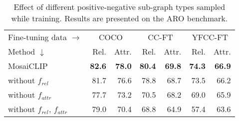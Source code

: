 \documentclass[11pt]{article}
\newcommand{\methodcomp}{MosaiCLIP}
\begin{document}
\begin{table}[h!]
\scriptsize
  \fontsize{8.5}{10pt}\selectfont
      \centering
      \setlength{\tabcolsep}{4.2pt}
      {
    \begin{tabular}{lrr|rr|rr}
      \toprule
      Fine-tuning data $\rightarrow$ & \multicolumn{2}{c}{COCO} & \multicolumn{2}{c}{CC-FT} & \multicolumn{2}{c}{YFCC-FT} \\
      Method $\downarrow$ & Rel. & Attr. & Rel. & Attr. & Rel. & Attr. \\
      \midrule 
      \methodcomp & \textbf{82.6} & \textbf{78.0} & \textbf{80.4} & \textbf{69.8} & \textbf{74.3} & \textbf{66.9} \\[1pt]
      \midrule 
      without $f_{rel}$ & 81.7 & 76.6 & 78.8 & 68.7 & 73.5 & 66.2\\[1pt]
      without $f_{attr}$ & 77.7 & 73.2 & 70.5 & 68.2 & 69.0 & 65.9\\[1pt]
      without $f_{rel}$, $f_{attr}$ & 79.0 & 70.4 & 68.8 & 64.9 & 57.4 & 63.6\\[1pt]
      \bottomrule
    \end{tabular}
    }
    
    \caption{Effect of different positive-negative sub-graph types sampled while training. Results are presented on the {\color{blue} ARO} benchmark.
    }
    \vspace{-1em}
    \label{ablations:different_kind_subgraphs}
\end{table}
 \vspace{-0.3em}
\end{document}

